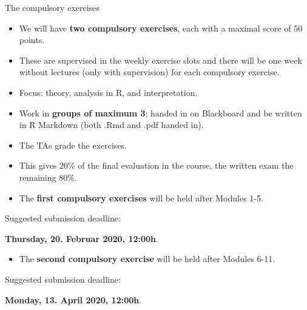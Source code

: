 \documentclass[10pt,ignorenonframetext,]{beamer}
\providecommand{\tightlist}{%
  \setlength{\itemsep}{0pt}\setlength{\parskip}{0pt}}
\begin{document}
\begin{frame}

\begin{block}{The compulsory exercises}

\begin{itemize}
\item
  We will have \textbf{two compulsory exercises}, each with a maximal
  score of 50 points.
\item
  These are supervised in the weekly exercise slots and there will be
  one week without lectures (only with supervision) for each compulsory
  exercise.
\item
  Focus: theory, analysis in R, and interpretation.
\item
  Work in \textbf{groups of maximum 3}; handed in on Blackboard and be
  written in R Markdown (both .Rmd and .pdf handed in).
\item
  The TAs grade the exercises.
\item
  This gives 20\% of the final evaluation in the course, the written
  exam the remaining 80\%.
\end{itemize}

\end{block}

\end{frame}

\begin{frame}

\begin{itemize}
\tightlist
\item
  The \textbf{first compulsory exercises} will be held after Modules
  1-5.
\end{itemize}

\hspace{8mm} Suggested submission deadline:

\hspace{8mm} \textbf{Thursday, 20. Februar 2020, 12:00h}.

\vspace{8mm}

\begin{itemize}
\tightlist
\item
  The \textbf{second compulsory exercise} will be held after Modules
  6-11.
\end{itemize}

\hspace{8mm}Suggested submission deadline:

\hspace{8mm}\textbf{Monday, 13. April 2020, 12:00h}.

\end{frame}
\end{document}
